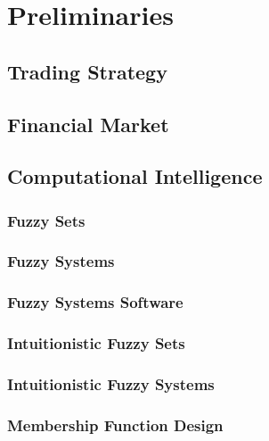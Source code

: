 \chapter{Preliminaries}
\label{chapter:preliminaries}

\section{Trading Strategy}
\label{section:trading-strategy}

\section{Financial Market}
\label{section:financial-market}

\section{Computational Intelligence}
\label{section:computational-intelligence}

\subsection{Fuzzy Sets}
\label{subsection:fuzzy-sets}

\subsection{Fuzzy Systems}
\label{subsection:fuzzy-systems}

\subsection{Fuzzy Systems Software}
\label{subsection:fuzzy-systems-software}

\subsection{Intuitionistic Fuzzy Sets}
\label{subsection:intuitionistic-fuzzy-sets}

\subsection{Intuitionistic Fuzzy Systems}
\label{subsection:intuitionistic-fuzzy-systems}

\subsection{Membership Function Design}
\label{subsection:membership-function-design}

